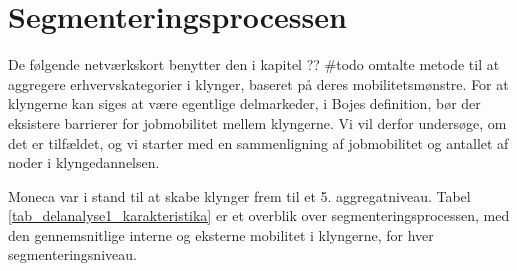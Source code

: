 



% 
% 
% 
% 
% 






%  
% 


\section{Segmenteringsprocessen \label{delanalyse1_segmenteringsprocessen}}


De følgende netværkskort benytter den i kapitel ?? \#todo omtalte metode til at aggregere erhvervskategorier i klynger, baseret på deres mobilitetsmønstre. For at klyngerne kan siges at være egentlige delmarkeder, i Bojes definition, bør der eksistere barrierer for jobmobilitet mellem klyngerne. Vi vil derfor undersøge, om det er tilfældet, og vi starter med en sammenligning af jobmobilitet og antallet af noder i klyngedannelsen. 

Moneca var i stand til at skabe klynger frem til et 5. aggregatniveau. Tabel \ref{tab_delanalyse1_karakteristika}  er et overblik over segmenteringsprocessen, med den gennemsnitlige interne og eksterne mobilitet i klyngerne, for hver segmenteringsniveau.

